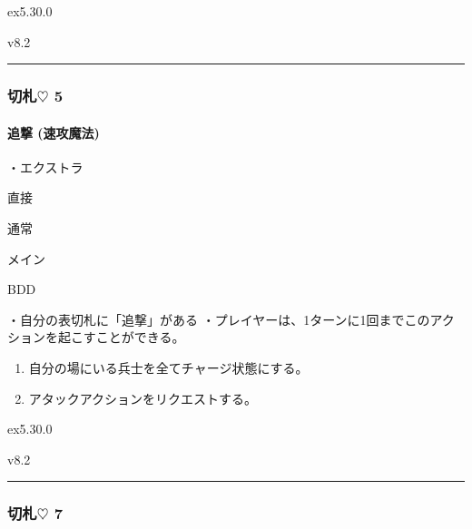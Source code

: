 \documentclass[letterpaper,10pt,dvipdfmx]{sphinxmanual}
\begin{document}
\sphinxAtStartPar
{}  ex5.30.0

\sphinxAtStartPar
{}  v8.2


\bigskip\hrule\bigskip



\subsubsection{切札{\normalsize $\heartsuit$} 5}
\label{\detokenize{auto/frameActionlist:id39}}

\paragraph{追撃 (速攻魔法)}
\label{\detokenize{auto/frameActionlist:act-pursuit}}\label{\detokenize{auto/frameActionlist:id40}}
\sphinxAtStartPar
{}

\sphinxAtStartPar
・エクストラ

\sphinxAtStartPar
{} 直接

\sphinxAtStartPar
{} 通常

\sphinxAtStartPar
{} メイン

\sphinxAtStartPar
{} BDD

\sphinxAtStartPar
{}

\sphinxAtStartPar
・自分の表切札に「追撃」がある
・プレイヤーは、1ターンに1回までこのアクションを起こすことができる。

\sphinxAtStartPar
{}
\begin{enumerate}
%
\item {} 
\sphinxAtStartPar
自分の場にいる兵士を全てチャージ状態にする。

\item {} 
\sphinxAtStartPar
アタックアクションをリクエストする。

\end{enumerate}

\sphinxAtStartPar
{}  ex5.30.0

\sphinxAtStartPar
{}  v8.2


\bigskip\hrule\bigskip



\subsubsection{切札{\normalsize $\heartsuit$} 7}
\label{\detokenize{auto/frameActionlist:id41}}
\end{document}
